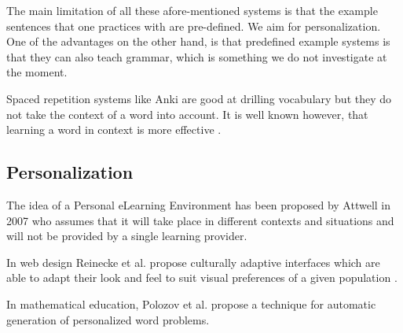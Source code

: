 The main limitation of all these afore-mentioned systems is that the example sentences that one practices with are pre-defined. We aim for personalization. One of the advantages on the other hand, is that predefined example systems is that they can also teach grammar, which is something we do not investigate at the moment.

Spaced repetition systems like Anki are good at drilling vocabulary but they do not take the context of a word into account. It is well known however, that learning a word in context is more effective \cite{nagy95-context}.

\subsection{Personalization}

The idea of a Personal eLearning Environment has been proposed by Attwell in 2007 \cite{Atwell07-personal} who assumes that it will take place in different contexts and situations and will not be provided by a single learning provider.

In web design Reinecke et al. propose culturally adaptive interfaces which are able to adapt their look and feel to suit visual preferences of a given population \cite{Reinecke13-CulturalAdaptation}. 

In mathematical education, Polozov et al. propose a technique for automatic generation of personalized word problems\cite{Polozov15-AdaptableMath}.









